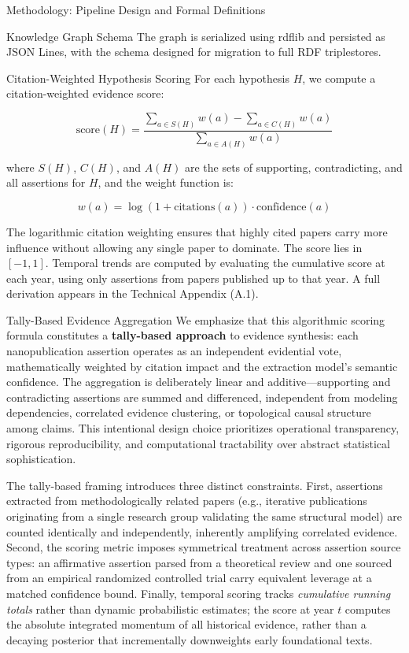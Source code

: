 \documentclass[
  ignorenonframetext,
]{beamer}
\begin{document}
\begin{frame}[fragile]{Methodology: Pipeline Design and Formal
Definitions}
\begin{block}{Knowledge Graph Schema}
The graph is serialized using rdflib \citep{rdflib2023} and persisted as
JSON Lines, with the schema designed for migration to full RDF
triplestores.
\end{block}

\begin{block}{Citation-Weighted Hypothesis Scoring}
\protect{}\label{citation-weighted-hypothesis-scoring}
For each hypothesis \(H\), we compute a citation-weighted evidence
score:

\[
\text{score}(H) = \frac{\sum_{a \in S(H)} w(a) - \sum_{a \in C(H)} w(a)}{\sum_{a \in A(H)} w(a)}
\]

where \(S(H)\), \(C(H)\), and \(A(H)\) are the sets of supporting,
contradicting, and all assertions for \(H\), and the weight function is:

\[
w(a) = \log(1 + \text{citations}(a)) \cdot \text{confidence}(a)
\]

The logarithmic citation weighting ensures that highly cited papers
carry more influence without allowing any single paper to dominate. The
score lies in \([-1, 1]\). Temporal trends are computed by evaluating
the cumulative score at each year, using only assertions from papers
published up to that year. A full derivation appears in the Technical
Appendix (A.1).
\end{block}

\begin{block}{Tally-Based Evidence Aggregation}
\protect{}\label{tally-based-evidence-aggregation}
We emphasize that this algorithmic scoring formula constitutes a
\textbf{tally-based approach} to evidence synthesis: each
nanopublication assertion operates as an independent evidential vote,
mathematically weighted by citation impact and the extraction model's
semantic confidence. The aggregation is deliberately linear and
additive---supporting and contradicting assertions are summed and
differenced, independent from modeling dependencies, correlated evidence
clustering, or topological causal structure among claims. This
intentional design choice prioritizes operational transparency, rigorous
reproducibility, and computational tractability over abstract
statistical sophistication.

The tally-based framing introduces three distinct constraints. First,
assertions extracted from methodologically related papers (e.g.,
iterative publications originating from a single research group
validating the same structural model) are counted identically and
independently, inherently amplifying correlated evidence. Second, the
scoring metric imposes symmetrical treatment across assertion source
types: an affirmative assertion parsed from a theoretical review and one
sourced from an empirical randomized controlled trial carry equivalent
leverage at a matched confidence bound. Finally, temporal scoring tracks
\emph{cumulative running totals} rather than dynamic probabilistic
estimates; the score at year \(t\) computes the absolute integrated
momentum of all historical evidence, rather than a decaying posterior
that incrementally downweights early foundational texts.


\end{block}
\end{frame}
\end{document}
